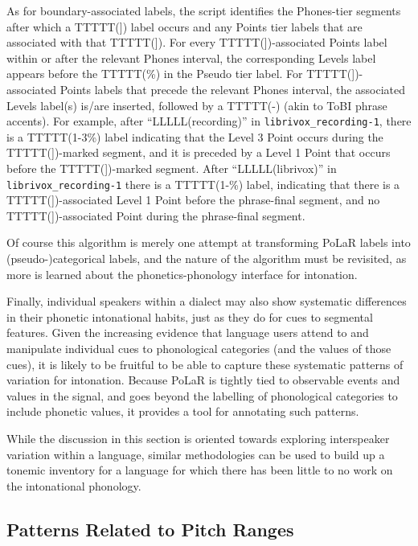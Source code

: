 \documentclass[11pt, twoside]{memoir}
\begin{document}
\begin{infobox}[frametitle=\textbf{Generating “Pseudo-Categorical” Labels from PoLaR Labels}]
	As for boundary-associated labels, the script identifies the Phones-tier segments after which a TTTTT(]) label occurs and any Points tier labels that are associated with that TTTTT(]). For every TTTTT(])-associated Points label within or after the relevant Phones interval, the corresponding Levels label appears before the TTTTT(\%) in the Pseudo tier label. For TTTTT(])-associated Points labels that precede the relevant Phones interval, the associated Levels label(s) is/are inserted, followed by a TTTTT(-) (akin to ToBI phrase accents). For example, after “LLLLL(recording)” in \texttt{librivox\_recording-1}, there is a TTTTT(1-3\%) label indicating that the Level 3 Point occurs during the TTTTT(])-marked segment, and it is preceded by a Level 1 Point that occurs before the TTTTT(])-marked segment. After “LLLLL(librivox)” in \texttt{librivox\_recording-1} there is a TTTTT(1-\%) label, indicating that there is a TTTTT(])-associated Level 1 Point before the phrase-final segment, and no TTTTT(])-associated Point during the phrase-final segment.

	Of course this algorithm is merely one attempt at transforming PoLaR labels into (pseudo-)categorical labels, and the nature of the algorithm must be revisited, as more is learned about the phonetics-phonology interface for intonation.
\end{infobox}

Finally, individual speakers within a dialect may also show systematic differences in their phonetic intonational habits, just as they do for cues to segmental features.  Given the increasing evidence that language users attend to and manipulate individual cues to phonological categories (and the values of those cues), it is likely to be fruitful to be able to capture these systematic patterns of variation for intonation.  Because PoLaR is tightly tied to observable events and values in the signal, and goes beyond the labelling of phonological categories to include phonetic values, it provides a tool for annotating such patterns.

While the discussion in this section is oriented towards exploring interspeaker variation within a language, similar methodologies can be used to build up a tonemic inventory for a language for which there has been little to no work on the intonational phonology.

\subsection{Patterns Related to Pitch Ranges}\label{sec:pitch-ranges}
\end{document}
